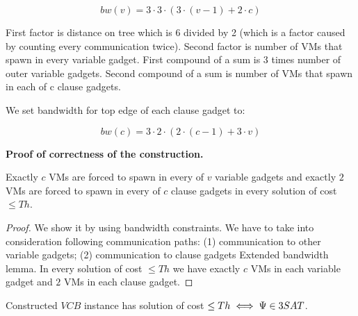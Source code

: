 $$ bw(v) = 3  \cdot  3  \cdot  (3  \cdot  (v - 1) + 2  \cdot  c) $$


First factor is distance on tree which is 6 divided by 2 (which is a
factor caused by counting every communication twice). Second factor is
number of VMs that spawn in every variable gadget. First compound of a
sum is 3 times number of outer variable gadgets. Second compound of a
sum is number of VMs that spawn in each of c clause gadgets.

We set bandwidth for top edge of each clause gadget to:

$$ bw(c) = 3  \cdot  2  \cdot  (2  \cdot  (c - 1) + 3  \cdot  v) $$

\textbf{Proof of correctness of the construction.}

\begin{lemma}
Exactly $c$ VMs are forced to spawn in every of $v$ variable gadgets
and exactly $2$ VMs are forced to spawn in every of $c$ clause gadgets
in every solution of cost $\leq Th$.
\end{lemma}

\begin{proof}
We show it by using bandwidth constraints. We have to take into
consideration following communication paths: (1) communication to
other variable gadgets; (2) communication to clause gadgets Extended
bandwidth lemma. In every solution of cost $\leq Th$ we have exactly
$c$ VMs in each variable gadget and $2$ VMs in each clause gadget.

\end{proof}

\begin{theorem}Constructed $VCB$ instance has solution of cost $\leq
  Th \iff \Psi \in 3SAT$.
\end{theorem}

